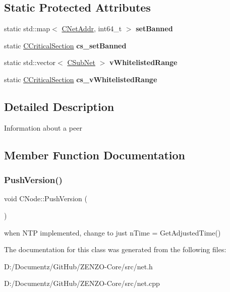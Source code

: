 \subsection*{Static Protected Attributes}
\begin{DoxyCompactItemize}
\item 
\mbox{\label{class_c_node_adf22d1873c1012ab3edb8a52253b203e}} 
static std\+::map$<$ \mbox{\hyperlink{class_c_net_addr}{C\+Net\+Addr}}, int64\+\_\+t $>$ {\bfseries set\+Banned}
\item 
\mbox{\label{class_c_node_a9ff9a6f07a280aa07d77713ae43d383a}} 
static \mbox{\hyperlink{class_annotated_mixin}{C\+Critical\+Section}} {\bfseries cs\+\_\+set\+Banned}
\item 
\mbox{\label{class_c_node_afaac354c1226990e4e9407ba2ee4cbf9}} 
static std\+::vector$<$ \mbox{\hyperlink{class_c_sub_net}{C\+Sub\+Net}} $>$ {\bfseries v\+Whitelisted\+Range}
\item 
\mbox{\label{class_c_node_a4a79c02f5024b57ca9e6a1f8d103f363}} 
static \mbox{\hyperlink{class_annotated_mixin}{C\+Critical\+Section}} {\bfseries cs\+\_\+v\+Whitelisted\+Range}
\end{DoxyCompactItemize}


\subsection{Detailed Description}
Information about a peer 

\subsection{Member Function Documentation}
\mbox{\label{class_c_node_a4dbfe4f6c1fd162aaa905e4bd201d536}} 
\subsubsection{\texorpdfstring{PushVersion()}{PushVersion()}}
{\footnotesize\ttfamily void C\+Node\+::\+Push\+Version (\begin{DoxyParamCaption}{ }\end{DoxyParamCaption})}

when N\+TP implemented, change to just n\+Time = Get\+Adjusted\+Time() 

The documentation for this class was generated from the following files\+:\begin{DoxyCompactItemize}
\item 
D\+:/\+Documentz/\+Git\+Hub/\+Z\+E\+N\+Z\+O-\/\+Core/src/net.\+h\item 
D\+:/\+Documentz/\+Git\+Hub/\+Z\+E\+N\+Z\+O-\/\+Core/src/net.\+cpp\end{DoxyCompactItemize}
